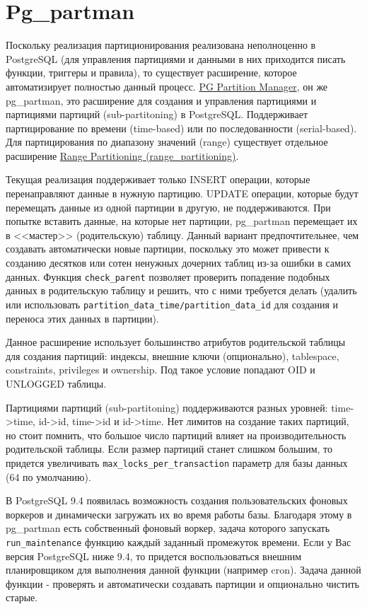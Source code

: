 \section{Pg\_partman}

Поскольку реализация партиционирования реализована неполноценно в PostgreSQL (для управления партициями и данными в них приходится писать функции, триггеры и правила), то существует расширение, которое автоматизирует полностью данный процесс. \href{https://github.com/keithf4/pg\_partman}{PG Partition Manager}, он же pg\_partman, это расширение для создания и управления партициями и партициями партиций (sub-partitoning) в PostgreSQL. Поддерживает партицирование по времени (time-based) или по последованности (serial-based). Для партицирования по диапазону значений (range) существует отдельное расширение \href{https://github.com/moat/range\_partitioning}{Range Partitioning (range\_partitioning)}.

Текущая реализация поддерживает только INSERT операции, которые перенаправляют данные в нужную партицию. UPDATE операции, которые будут перемещать данные из одной партиции в другую, не поддерживаются. При попытке вставить данные, на которые нет партиции, pg\_partman перемещает их в <<мастер>> (родительскую) таблицу. Данный вариант предпочтительнее, чем создавать автоматически новые партиции, поскольку это может привести к созданию десятков или сотен ненужных дочерних таблиц из-за ошибки в самих данных. Функция \lstinline!check_parent! позволяет проверить попадение подобных данных в родительскую таблицу и решить, что с ними требуется делать (удалить или использовать \lstinline!partition_data_time/partition_data_id! для создания и переноса этих данных в партиции).

Данное расширение использует большинство атрибутов родительской таблицы для создания партиций: индексы, внешние ключи (опционально), tablespace, constraints, privileges и ownership. Под такое условие попадают OID и UNLOGGED таблицы.

Партициями партиций (sub-partitoning) поддерживаются разных уровней: time->time, id->id, time->id и id->time. Нет лимитов на создание таких партиций, но стоит помнить, что большое число партиций влияет на производительность родительской таблицы. Если размер партиций станет слишком большим, то придется увеличивать \lstinline!max_locks_per_transaction! параметр для базы данных (64 по умолчанию).

В PostgreSQL 9.4 появилась возможность создания пользовательских фоновых воркеров и динамически загружать их во время работы базы. Благодаря этому в pg\_partman есть собственный фоновый воркер, задача которого запускать \lstinline!run_maintenance! функцию каждый заданный промежуток времени. Если у Вас версия PostgreSQL ниже 9.4, то придется воспользоваться внешним планировщиком для выполнения данной функции (например cron). Задача данной функции - проверять и автоматически создавать партиции и опционально чистить старые.

